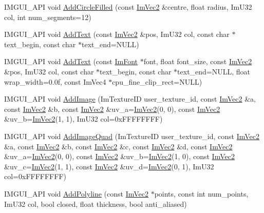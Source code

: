 \begin{DoxyCompactItemize}
\item 
I\+M\+G\+U\+I\+\_\+\+A\+PI void \hyperlink{struct_im_draw_list_a293e87d22e17587e3994cf6deb20be45}{Add\+Circle\+Filled} (const \hyperlink{struct_im_vec2}{Im\+Vec2} \&centre, float radius, Im\+U32 col, int num\+\_\+segments=12)
\item 
I\+M\+G\+U\+I\+\_\+\+A\+PI void \hyperlink{struct_im_draw_list_ac5221bd86b3429f6d5b6e6ffe454942d}{Add\+Text} (const \hyperlink{struct_im_vec2}{Im\+Vec2} \&pos, Im\+U32 col, const char $\ast$text\+\_\+begin, const char $\ast$text\+\_\+end=N\+U\+LL)
\item 
I\+M\+G\+U\+I\+\_\+\+A\+PI void \hyperlink{struct_im_draw_list_a0a226cbe9bb1480428e145d8535cda26}{Add\+Text} (const \hyperlink{struct_im_font}{Im\+Font} $\ast$font, float font\+\_\+size, const \hyperlink{struct_im_vec2}{Im\+Vec2} \&pos, Im\+U32 col, const char $\ast$text\+\_\+begin, const char $\ast$text\+\_\+end=N\+U\+LL, float wrap\+\_\+width=0.\+0f, const Im\+Vec4 $\ast$cpu\+\_\+fine\+\_\+clip\+\_\+rect=\+N\+U\+L\+L)
\item 
I\+M\+G\+U\+I\+\_\+\+A\+PI void \hyperlink{struct_im_draw_list_ac37cd998bf5f40705c7445004a029b66}{Add\+Image} (Im\+Texture\+ID user\+\_\+texture\+\_\+id, const \hyperlink{struct_im_vec2}{Im\+Vec2} \&a, const \hyperlink{struct_im_vec2}{Im\+Vec2} \&b, const \hyperlink{struct_im_vec2}{Im\+Vec2} \&uv\+\_\+a=\hyperlink{struct_im_vec2}{Im\+Vec2}(0, 0), const \hyperlink{struct_im_vec2}{Im\+Vec2} \&uv\+\_\+b=\hyperlink{struct_im_vec2}{Im\+Vec2}(1, 1), Im\+U32 col=0x\+F\+F\+F\+F\+F\+F\+F\+F)
\item 
I\+M\+G\+U\+I\+\_\+\+A\+PI void \hyperlink{struct_im_draw_list_a1cc1f8d4d1812c65c7887b8d5aef31fe}{Add\+Image\+Quad} (Im\+Texture\+ID user\+\_\+texture\+\_\+id, const \hyperlink{struct_im_vec2}{Im\+Vec2} \&a, const \hyperlink{struct_im_vec2}{Im\+Vec2} \&b, const \hyperlink{struct_im_vec2}{Im\+Vec2} \&c, const \hyperlink{struct_im_vec2}{Im\+Vec2} \&d, const \hyperlink{struct_im_vec2}{Im\+Vec2} \&uv\+\_\+a=\hyperlink{struct_im_vec2}{Im\+Vec2}(0, 0), const \hyperlink{struct_im_vec2}{Im\+Vec2} \&uv\+\_\+b=\hyperlink{struct_im_vec2}{Im\+Vec2}(1, 0), const \hyperlink{struct_im_vec2}{Im\+Vec2} \&uv\+\_\+c=\hyperlink{struct_im_vec2}{Im\+Vec2}(1, 1), const \hyperlink{struct_im_vec2}{Im\+Vec2} \&uv\+\_\+d=\hyperlink{struct_im_vec2}{Im\+Vec2}(0, 1), Im\+U32 col=0x\+F\+F\+F\+F\+F\+F\+F\+F)
\item 
I\+M\+G\+U\+I\+\_\+\+A\+PI void \hyperlink{struct_im_draw_list_a3ca939b6e4b35a93611d2d42d7e20434}{Add\+Polyline} (const \hyperlink{struct_im_vec2}{Im\+Vec2} $\ast$points, const int num\+\_\+points, Im\+U32 col, bool closed, float thickness, bool anti\+\_\+aliased)

\end{DoxyCompactItemize}
